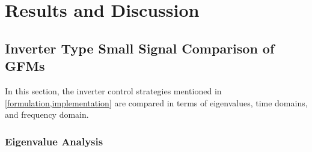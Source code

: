 
\chapter{Results and Discussion}\label{results}
\section{Inverter Type Small Signal Comparison of GFMs}
In this section, the inverter control strategies mentioned in \cref{formulation,implementation} are compared in terms of eigenvalues, time domains, and frequency domain. 
\subsection{Eigenvalue Analysis}\label{numberofpoles}


\begin{table}[ht]
\centering
\caption[Number of Poles in each Inverter]{Number of Eigenvalues for Each Strategy}
\label{tbl:numpole}
\end{table}




